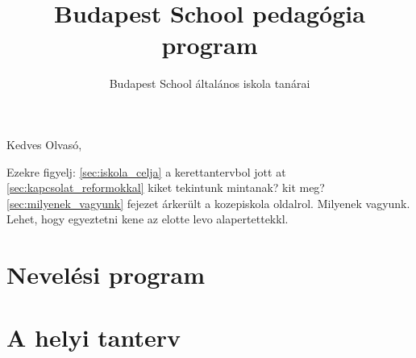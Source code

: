 \documentclass[magyar,12pt,a4paper,draft]{report}
\begin{document}
\newif\ifkerettanterv
\kerettantervfalse

\title{Budapest School pedagógia program}
\author{Budapest School általános iskola tanárai}
\maketitle

Kedves Olvasó,

Ezekre figyelj:
\ref{sec:iskola_celja} a kerettantervbol jott at
\ref{sec:kapcsolat_reformokkal} kiket tekintunk mintanak? kit meg?
\ref{sec:milyenek_vagyunk} fejezet árkerült a kozepiskola oldalrol. Milyenek vagyunk. Lehet, hogy egyeztetni kene az elotte levo alapertettekkl.


\tableofcontents
\newpage
\part{Nevelési program}


\part{A helyi tanterv}



{}
\label{sec:bibliographyk}

\end{document}
